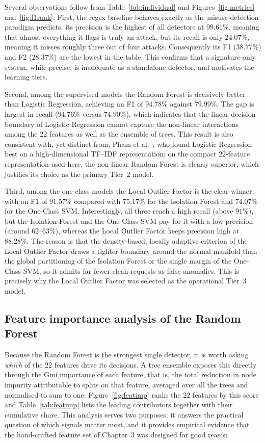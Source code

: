 \documentclass[../main.tex]{subfiles}
\begin{document}
Several observations follow from Table~\ref{tab:individual} and
Figures~\ref{fig:metrics} and~\ref{fig:f1rank}. First, the regex baseline
behaves exactly as the misuse-detection paradigm predicts: its precision is
the highest of all detectors at $99.61\%$, meaning that almost everything it
flags is truly an attack, but its recall is only $24.07\%$, meaning it misses
roughly three out of four attacks. Consequently its F1 ($38.77\%$) and F2
($28.37\%$) are the lowest in the table. This confirms that a signature-only
system, while precise, is inadequate as a standalone detector, and motivates
the learning tiers.

Second, among the supervised models the Random Forest is decisively better
than Logistic Regression, achieving an F1 of $94.78\%$ against $79.99\%$. The
gap is largest in recall ($94.76\%$ versus $74.90\%$), which indicates that
the linear decision boundary of Logistic Regression cannot capture the
non-linear interactions among the $22$ features as well as the ensemble of
trees. This result is also consistent with, yet distinct from, Pham et
al.~\cite{pham2016}, who found Logistic Regression best on a high-dimensional
TF--IDF representation; on the compact $22$-feature representation used here,
the non-linear Random Forest is clearly superior, which justifies its choice
as the primary Tier~2 model.

Third, among the one-class models the Local Outlier Factor is the clear
winner, with an F1 of $91.57\%$ compared with $75.17\%$ for the Isolation
Forest and $74.07\%$ for the One-Class SVM. Interestingly, all three reach a
high recall (above $91\%$), but the Isolation Forest and the One-Class SVM
pay for it with a low precision (around $62$--$63\%$), whereas the Local
Outlier Factor keeps precision high at $88.28\%$. The reason is that the
density-based, locally adaptive criterion of the Local Outlier Factor draws a
tighter boundary around the normal manifold than the global partitioning of
the Isolation Forest or the single margin of the One-Class SVM, so it admits
far fewer clean requests as false anomalies. This is precisely why the Local
Outlier Factor was selected as the operational Tier~3 model.

\subsection{Feature importance analysis of the Random Forest}
\label{sec:res-featimp}

Because the Random Forest is the strongest single detector, it is worth asking
\emph{which} of the $22$ features drive its decisions. A tree ensemble exposes
this directly through the Gini importance of each feature, that is, the total
reduction in node impurity attributable to splits on that feature, averaged
over all the trees and normalised to sum to one. Figure~\ref{fig:featimp}
ranks the $22$ features by this score and Table~\ref{tab:featimp} lists the
leading contributors together with their cumulative share. This analysis
serves two purposes: it answers the practical question of which signals matter
most, and it provides empirical evidence that the hand-crafted feature set of
Chapter~3 was designed for good reason.
\end{document}
